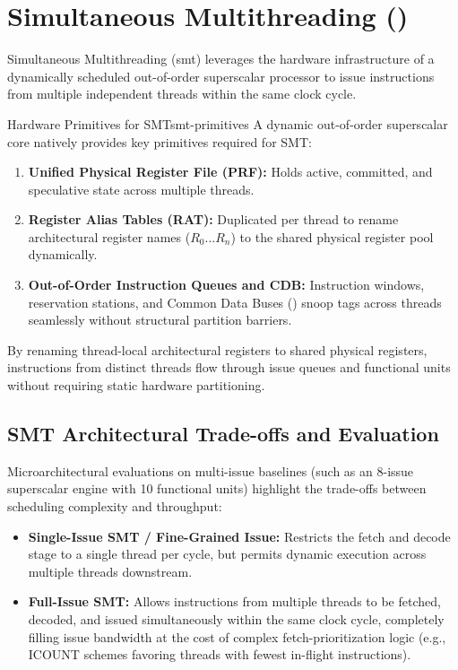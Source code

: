 \section{Simultaneous Multithreading ()}
\label{sec:smt}

Simultaneous Multithreading (\gls{smt}) leverages the hardware infrastructure of a dynamically scheduled out-of-order superscalar processor to issue instructions from multiple independent threads within the same clock cycle.

\begin{concept}{Hardware Primitives for SMT}{smt-primitives}
    A dynamic out-of-order superscalar core natively provides key primitives required for SMT:
    \begin{enumerate}
        \item \textbf{Unified Physical Register File (PRF):} Holds active, committed, and speculative state across multiple threads.
        \item \textbf{Register Alias Tables (RAT):} Duplicated per thread to rename architectural register names ($R_0 \dots R_n$) to the shared physical register pool dynamically.
        \item \textbf{Out-of-Order Instruction Queues and CDB:} Instruction windows, reservation stations, and Common Data Buses () snoop tags across threads seamlessly without structural partition barriers.
    \end{enumerate}
\end{concept}

By renaming thread-local architectural registers to shared physical registers, instructions from distinct threads flow through issue queues and functional units without requiring static hardware partitioning.

\subsection{SMT Architectural Trade-offs and Evaluation}

Microarchitectural evaluations on multi-issue baselines (such as an 8-issue superscalar engine with 10 functional units) highlight the trade-offs between scheduling complexity and throughput:

\begin{itemize}
    \item \textbf{Single-Issue SMT / Fine-Grained Issue:} Restricts the fetch and decode stage to a single thread per cycle, but permits dynamic execution across multiple threads downstream.
    \item \textbf{Full-Issue SMT:} Allows instructions from multiple threads to be fetched, decoded, and issued simultaneously within the same clock cycle, completely filling issue bandwidth at the cost of complex fetch-prioritization logic (e.g., \textsf{ICOUNT} schemes favoring threads with fewest in-flight instructions).
\end{itemize}

